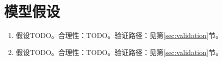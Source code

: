 \section{模型假设}

\begin{enumerate}
  \item 假设TODO。合理性：TODO。验证路径：见第\ref{sec:validation}节。
  \item 假设TODO。合理性：TODO。验证路径：见第\ref{sec:validation}节。
\end{enumerate}
